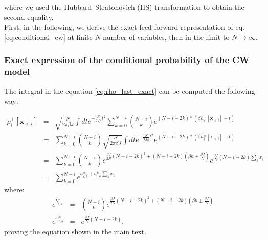 \documentclass[10pt, notitlepage]{revtex4-2}
\begin{document}
 where we used the Hubbard–Stratonovich (HS) transformation to obtain the second equality.\\
 First, in the following, we derive the exact feed-forward representation of eq.\ref{eq:conditional_cw} at finite $N$ number of variables, then in the limit to $N\rightarrow \infty$.\\

 \subsubsection{Exact expression of the conditional probability of the CW model}
 The integral in the equation \ref{eq:rho_last_exact} can be computed the following way:

 \begin{eqnarray*}
 \rho_i^{\pm}[\mathbf{x}_{<i}] &=& \sqrt{\frac{N}{2\pi \beta J}}\int dt e^{-\frac{N}{2J \beta}t^{2}} 
 \sum_{k=0}^{N-i} \binom{N-i}{k} e^{(N-i-2k)*(\beta h_i^{\pm}[\mathbf{x}_{<i}] + t)}\\
 &=& \sum_{k=0}^{N-i} \binom{N-i}{k} \sqrt{\frac{N}{2\pi \beta J}}\int dt e^{-\frac{N}{2J \beta}t^{2}} 
  e^{(N-i-2k)*(\beta h_i^{\pm}[\mathbf{x}_{<i}] + t)}\\
&=& \sum_{k=0}^{N-i} \binom{N-i}{k}e^{\frac{\beta J}{2N}\left(N-i-2k\right)^{2}+\left(N-i-2k\right)\left(\beta h \pm \frac{\beta J}{N}\right)} e^{\frac{\beta J}{N}\left(N-i-2k\right) \sum_s x_s} \\
&=& \sum_{k=0}^{N-i} e^{a_{i,k}^{\pm} + b_{i,k}^{\pm} \sum_s x_s} 
\end{eqnarray*}
where:
\begin{eqnarray}
\label{eq:params}
e^{b_{i,k}^{\pm}} & = & \binom{N-i}{k}e^{\frac{\beta J}{2N}\left(N-i-2k\right)^{2}+\left(N-i-2k\right)\left(\beta h \pm \frac{\beta J}{N}\right)}\\
e^{\omega_{i,k}^{\pm}} & = & e^{\frac{\beta J}{N}\left(N-i-2k\right)},
\end{eqnarray}
proving the equation shown in the main text.
\end{document}
